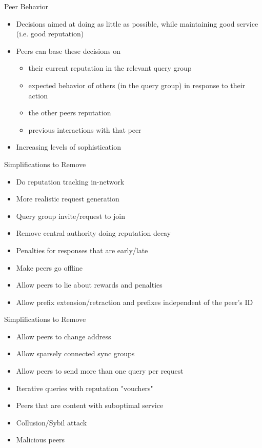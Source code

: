 \documentclass[presentation,english,usenames,dvipsnames]{beamer}
\begin{document}
\begin{frame}{Peer Behavior}
  \begin{itemize}
    \item Decisions aimed at doing as little as possible, while maintaining good
          service (i.e. good reputation)
    \item Peers can base these decisions on
    \begin{itemize}
      \item their current reputation in the relevant query group
      \item expected behavior of others (in the query group) in response to
            their action
      \item the other peers reputation
      \item previous interactions with that peer
    \end{itemize}
    \item Increasing levels of sophistication
  \end{itemize}
\end{frame}

\begin{frame}{Simplifications to Remove}
  \begin{itemize}
    \item Do reputation tracking in-network
    \item More realistic request generation
    \item Query group invite/request to join
    \item Remove central authority doing reputation decay
    \item Penalties for responses that are early/late
    \item Make peers go offline
    \item Allow peers to lie about rewards and penalties
    \item Allow prefix extension/retraction and prefixes independent of the
          peer's ID
  \end{itemize}
\end{frame}

\begin{frame}{Simplifications to Remove}
  \begin{itemize}
    \item Allow peers to change address
    \item Allow sparsely connected sync groups
    \item Allow peers to send more than one query per request
    \item Iterative queries with reputation "vouchers"
    \item Peers that are content with suboptimal service
    \item Collusion/Sybil attack
    \item Malicious peers
  \end{itemize}
\end{frame}
\end{document}
